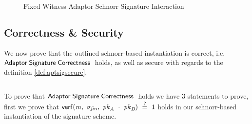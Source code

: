 \begin{figure}
    \caption{Fixed Witness Adaptor Schnorr Signature Interaction}
    \label{fig:aptSchnorrInteraction}
\end{figure}

\subsection{Correctness \& Security}\label{sec:twopartyAptSecurity}

We now prove that the outlined schnorr-based instantiation is correct, i.e. $\mathsf{Adaptor\;Signature\;Correctness\;}$ holds, as well as secure with regards to the definition \ref{def:aptsigsecure}.

\subsection{\cnstAptSigCorrectness}\label{subsec:cnstaptsigcorrectness}

To prove that $\mathsf{Adaptor\;Signature\;Correctness\;}$ holds we have 3 statements to prove, first we prove that $\mathsf{verf}(\mathit{m} ,~ \sigma_{\mathit{fin}} ,~ \mathit{pk}_{\mathit{A}} ~\cdot~ \mathit{pk}_{\mathit{B}}) ~\stackrel{?}{=}~ 1$ holds in our schnorr-based instantiation of the signature scheme.

